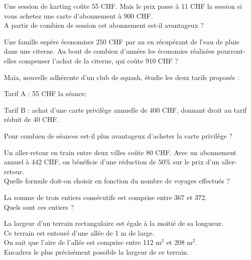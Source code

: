 \begin{exercice}[]
Une session de karting coûte 55 CHF. Mais le prix passe à 11 CHF la session si vous 	achetez une carte d’abonnement à 900 CHF.\\
A partir de combien de session cet abonnement est-il avantageux ?
\end{exercice}

\begin{exercice}[]
Une famille espère économiser 250 CHF par an en récupérant de l’eau de pluie dans 	une citerne. Au bout de combien d’années les économies réalisées pourront-elles 	compenser l’achat de la citerne, qui coûte 910 CHF ?
\end{exercice}

\begin{exercice}[]
Maïa, nouvelle adhérente d’un club de squash, étudie les deux tarifs proposés :
\begin{description}
\item Tarif A : 55 CHF la séance;
\item Tarif B : achat d’une carte privilège annuelle de 400 CHF, donnant droit au tarif réduit de 40 CHF.
\end{description}
Pour combien de séances est-il plus avantageux d’acheter la carte privilège ?
\end{exercice}

\begin{exercice}[]
Un aller-retour en train entre deux villes coûte 80 CHF. Avec un abonnement annuel à 442 CHF, on bénéficie d’une réduction de $50\%$ sur le prix d’un aller-retour.\\
Quelle formule doit-on choisir en fonction du nombre de voyages effectués ?
\end{exercice}
	
\begin{exercice}[]
La somme de trois entiers consécutifs est comprise entre 367 et 372.\\ 
Quels sont ces entiers ?
\end{exercice}
	
\begin{exercice}[]
La largeur d’un terrain rectangulaire est égale à la moitié de sa longueur.\\
Ce terrain est entouré d’une allée de 1 m de large.\\
On sait que l’aire de l’allée est comprise entre 112 m$^{2}$ et 208 m$^{2}$.\\
Encadrez le plus précisément possible la largeur de ce terrain.\\\\\\\\\\\\
\end{exercice}


